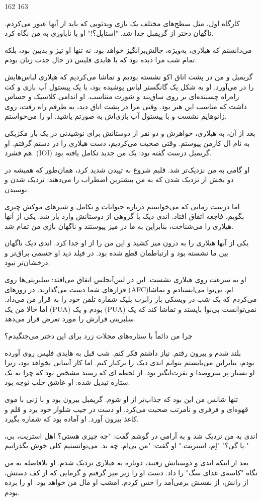 162 163

کارگاه اول، مثل سطح‌های مختلف یک بازی ویدئویی که باید از آنها عبور می‌کردم. ناگهان دختر از گریمبل جدا شد. "استایل؟!" او با ناباوری به من نگاه کرد.

می‌دانستم که هیلاری، به‌ویژه، چالش‌برانگیز خواهد بود. نه تنها او تیز و بدبین بود، بلکه تمام شب مرا دیده بود که با هایدی فلیس در حال جذب زنان بودم.

گریمبل و من در پشت اتاق اکو نشسته بودیم و تماشا می‌کردیم که هیلاری لباس‌هایش را در می‌آورد. او به شکل یک گانگستر لباس پوشیده بود، با یک پیستول آب بازی و کت راه‌راه چسبنده‌ای بر روی ساق‌بند و شورت متناسب. او اندامی کلاسیک و حساس داشت که مناسب این هنر بود. وقتی مرا در پشت اتاق دید، به طرفم راه رفت، روی زانوهایم نشست و با پیستول آب بازی‌اش به صورتم پاشید. او را می‌خواستم.

بعد از آن، به هیلاری، خواهرش و دو نفر از دوستانش برای نوشیدنی در یک بار مکزیکی به نام ال کارمن پیوستم. وقتی صحبت می‌کردیم، دست هیلاری را در دستم گرفتم. او هم فشرد. (IOI) گریمبل درست گفته بود: یک من جدید تکامل یافته بود.

او گامی به من نزدیک‌تر شد. قلبم شروع به تپیدن شدید کرد، همان‌طور که همیشه در دو بخش از نزدیک شدن که به من بیشترین اضطراب را می‌دهند: نزدیک شدن و بوسیدن.

اما درست زمانی که می‌خواستم درباره حیوانات و تکامل و شیرهای موکش چیزی بگویم، فاجعه اتفاق افتاد. اندی دیک با گروهی از دوستانش وارد بار شد. یکی از آنها هیلاری را می‌شناخت، بنابراین به ما در میز پیوستند و ناگهان بازی من تمام شد.

یکی از آنها هیلاری را به درون میز کشید و این من را از او جدا کرد. اندی دیک ناگهان بین ما نشسته بود و ارتباطمان قطع شده بود. در فیلد دید او جسمی براق‌تر و درخشان‌تر نبود.

او به سرعت روی هیلاری نشست. این در لس‌آنجلس اتفاق می‌افتد: سلبریتی‌ها روی قرارهای شما دست می‌گذارند. در روزهای (AFC)ام، بی‌نوا می‌ایستادم و تماشا می‌کردم که یک شب در ویسکی بار رابرت بلیک شماره تلفن خود را به قرار من می‌داد. اما حالا من یک (PUA) بودم و یک (PUA) نمی‌توانست بی‌نوا بایستد و تماشا کند که یک سلبریتی قرارش را مورد تعرض قرار می‌دهد.

چرا من دائماً با ستاره‌های مجلات زرد برای این دختر می‌جنگیدم؟

بلند شدم و بیرون رفتم. نیاز داشتم فکر کنم. شب قبل به هایدی فلیس روی آورده بودم، بنابراین می‌بایستم بتوانم اندی دیک را برکنار کنم. اما کار آسانی نخواهد بود، زیرا او بسیار پر سروصدا و نفرت‌انگیز بود. از لحظه ای که رسید مشخص بود که چرا به یک ستاره تبدیل شده: او عاشق جلب توجه بود.

تنها شانس من این بود که جذاب‌تر از او شوم. گریمبل بیرون بود و با زنی با موی قهوه‌ای و فرفری و نامرتب صحبت می‌کرد. او دست در جیب شلوار خود برد و قلم و کاغذ بیرون آورد. او آماده بود که شماره بگیرد.

اندی به من نزدیک شد و به آرامی در گوشم گفت: "چه چیزی هستی؟ اهل استریت، بی، یا گی؟" "اِم، استریت." او گفت: "من بی‌ام. چه بد. می‌توانستیم کلی خوش بگذرانیم."

بعد از اینکه اندی و دوستانش رفتند، دوباره به هیلاری نزدیک شدم. او بلافاصله به من نگاه "کاسه‌ی غذای سگ" را داد. دست او را زیر میز گرفتم و گرمایی که از کف دستش، از رانش، از نفسش برمی‌آمد را حس کردم. امشب او مال من خواهد بود. او را برده بودم.